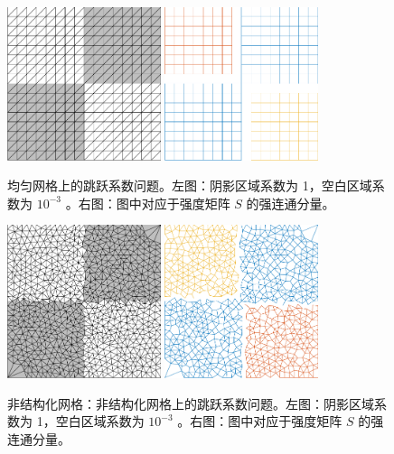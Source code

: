 \documentclass[12pt]{acta_2011xz}
\begin{document}
   \begin{figure}[!ht]
\centering
{\includegraphics*[width=0.4\textwidth]{jump1reg}}\hspace*{0.1\textwidth}
{\includegraphics*[width=0.4\textwidth]{jump2reg}}
\caption{均匀网格上的跳跃系数问题。左图：阴影区域系数为 1，空白区域系数为
   $10^{-3}$    。右图：图中对应于强度矩阵    $S$    的强连通分量。   \label{fig:jump1}     }
\end{figure}     

   \begin{figure}[!ht]
\centering
{\includegraphics*[width=0.4\textwidth]{jump1u}}\hspace*{0.1\textwidth}
{\includegraphics*[width=0.4\textwidth]{jump2u}}
\caption{非结构化网格：非结构化网格上的跳跃系数问题。左图：阴影区域系数为 1，空白区域系数为    $10^{-3}$    。右图：图中对应于强度矩阵    $S$    的强连通分量。   \label{fig:jump2}     }
\end{figure}     
\end{document}
